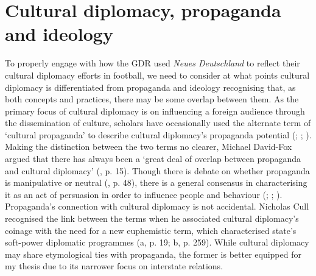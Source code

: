 \section{Cultural diplomacy, propaganda and ideology}

To properly engage with how the GDR used \textit{Neues Deutschland} to reflect their cultural diplomacy efforts in football, we need to consider at what points cultural diplomacy is differentiated from propaganda and ideology recognising that, as both concepts and practices, there may be some overlap between them. As the primary focus of cultural diplomacy is on influencing a foreign audience through the dissemination of culture, scholars have occasionally used the alternate term of ‘cultural propaganda’ to describe cultural diplomacy’s propaganda potential (\cite{prevots1998}; \cite{david-fox2011}; \cite{faircloughwiggins2016}). Making the distinction between the two terms no clearer, Michael David-Fox argued that there has always been a ‘great deal of overlap between propaganda and cultural diplomacy’ (\citeyear{david-fox2011}, p. 15). Though there is debate on whether propaganda is manipulative or neutral (\cite{diggs-brown2011}, p. 48), there is a general consensus in characterising it as an act of persuasion in order to influence people and behaviour (\cite{blackroberts2011}; \cite{auerbachcastronovo2013}; \cite{milleretal2016}). Propaganda’s connection with cultural diplomacy is not accidental. Nicholas Cull recognised the link between the terms when he associated cultural diplomacy’s coinage with the need for a new euphemistic term, which characterised state’s soft-power diplomatic programmes (\citeyear{cull2008a}a, p. 19; \citeyear{cull2008b}b, p. 259). While cultural diplomacy may share etymological ties with propaganda, the former is better equipped for my thesis due to its narrower focus on interstate relations.

